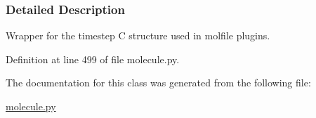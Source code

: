 \subsubsection{Detailed Description}
Wrapper for the timestep C structure used in molfile plugins. 



Definition at line 499 of file molecule.\-py.



The documentation for this class was generated from the following file\-:\begin{DoxyCompactItemize}
\item 
\hyperlink{molecule_8py}{molecule.\-py}\end{DoxyCompactItemize}
